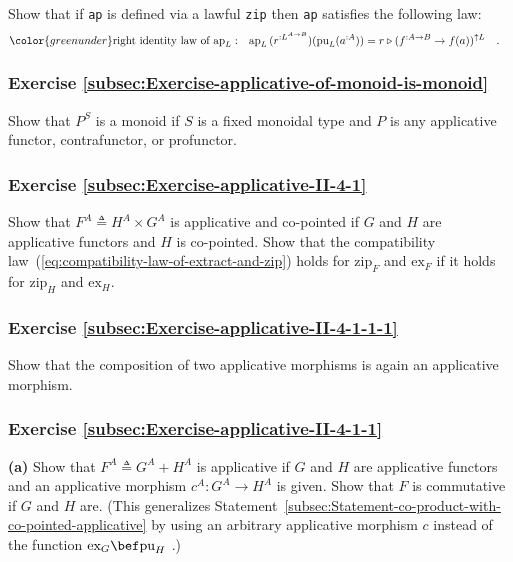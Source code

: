 Show that if \lstinline!ap! is defined via a lawful \lstinline!zip!
then \lstinline!ap! satisfies the following law:
\begin{align*}
{\color{greenunder}\text{right identity law of }\text{ap}_{L}:}\quad & \text{ap}_{L}\,(r^{:L^{A\rightarrow B}})(\text{pu}_{L}(a^{:A}))=r\triangleright(f^{:A\rightarrow B}\rightarrow f(a))^{\uparrow L}\quad.
\end{align*}


\subsubsection{Exercise \label{subsec:Exercise-applicative-of-monoid-is-monoid}\ref{subsec:Exercise-applicative-of-monoid-is-monoid}}

Show that $P^{S}$ is a monoid if $S$ is a fixed monoidal type and
$P$ is any applicative functor, contrafunctor, or profunctor.

\subsubsection{Exercise \label{subsec:Exercise-applicative-II-4-1}\ref{subsec:Exercise-applicative-II-4-1}}

Show that $F^{A}\triangleq H^{A}\times G^{A}$ is applicative and
co-pointed if $G$ and $H$ are applicative functors and $H$ is co-pointed.
Show that the compatibility law~(\ref{eq:compatibility-law-of-extract-and-zip})
holds for $\text{zip}_{F}$ and $\text{ex}_{F}$ if it holds for $\text{zip}_{H}$
and $\text{ex}_{H}$.

\subsubsection{Exercise \label{subsec:Exercise-applicative-II-4-1-1-1}\ref{subsec:Exercise-applicative-II-4-1-1-1}}

Show that the composition of two applicative morphisms is again an
applicative morphism.

\subsubsection{Exercise \label{subsec:Exercise-applicative-II-4-1-1}\ref{subsec:Exercise-applicative-II-4-1-1}}

\textbf{(a)} Show that $F^{A}\triangleq G^{A}+H^{A}$ is applicative
if $G$ and $H$ are applicative functors and an applicative morphism
$c^{A}:G^{A}\rightarrow H^{A}$ is given. Show that $F$ is commutative
if $G$ and $H$ are. (This generalizes Statement~\ref{subsec:Statement-co-product-with-co-pointed-applicative}
by using an arbitrary applicative morphism $c$ instead of the function
$\text{ex}_{G}\bef\text{pu}_{H}$ .)

